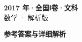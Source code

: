 \documentclass[zihao=-4, a4paper]{ctexart}
\begin{document}
\begin{center}
  {\Large\bfseries 2017 年·全国Ⅰ卷·文科}\\[4pt]
  {\large 数学 · 解析版}
\end{center}
\medskip
{}

\clearpage
{}
\begin{center}{\Large\bfseries 参考答案与详细解析}\end{center}
\medskip

\end{document}
